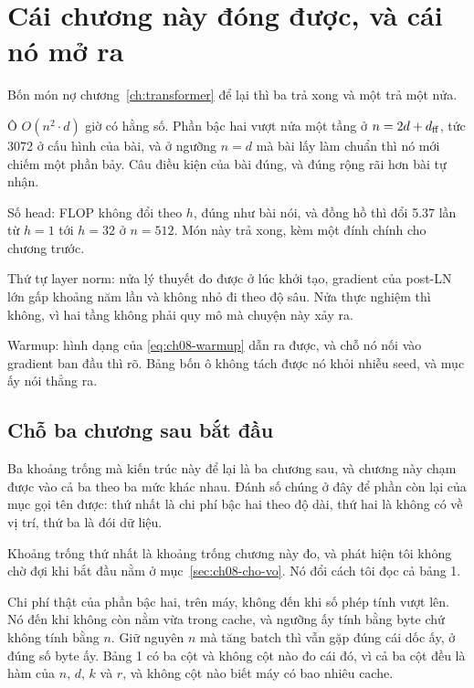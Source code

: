 \section{Cái chương này đóng được, và cái nó mở ra}
\label{sec:ch08-con-lai-gi}

%
Bốn món nợ chương~\ref{ch:transformer} để lại thì ba trả xong và một trả một
nửa.

Ô \(O(n^2 \cdot d)\) giờ có hằng số. Phần bậc hai vượt nửa một tầng ở
\(n = 2d + d_{\mathrm{ff}}\), tức 3072 ở cấu hình của bài, và ở ngưỡng \(n = d\) mà bài lấy
làm chuẩn thì nó mới chiếm một phần bảy. Câu điều kiện của bài đúng, và đúng
rộng rãi hơn bài tự nhận.

Số head: FLOP không đổi theo \(h\), đúng như bài nói, và đồng hồ thì đổi 5.37
lần từ \(h = 1\) tới \(h = 32\) ở \(n = 512\). Món này trả xong, kèm một đính chính cho chương
trước.

Thứ tự layer norm: nửa lý thuyết đo được ở lúc khởi tạo, gradient của post-LN
lớn gấp khoảng năm lần và không nhỏ đi theo độ sâu. Nửa thực nghiệm thì không,
vì hai tầng không phải quy mô mà chuyện này xảy ra.

Warmup: hình dạng của \eqref{eq:ch08-warmup} dẫn ra được, và chỗ nó nối vào
gradient ban đầu thì rõ. Bảng bốn ô không tách được nó khỏi nhiễu seed, và mục
ấy nói thẳng ra.

\subsection*{Chỗ ba chương sau bắt đầu}

Ba khoảng trống mà kiến trúc này để lại là ba chương sau, và chương này chạm
được vào cả ba theo ba mức khác nhau. Đánh số chúng ở đây để phần còn lại của
mục gọi tên được: thứ nhất là chi phí bậc hai theo độ dài, thứ hai là không có
 về vị trí, thứ ba là đói dữ liệu.

%
Khoảng trống thứ nhất là khoảng trống chương này đo, và phát hiện tôi không chờ
đợi khi bắt đầu nằm ở mục~\ref{sec:ch08-cho-vo}. Nó đổi cách tôi đọc cả bảng 1.

Chi phí thật của phần bậc hai, trên máy, không đến khi số phép tính vượt lên. Nó
đến khi  không còn nằm vừa trong cache, và
ngưỡng ấy tính bằng
byte chứ không tính bằng \(n\). Giữ nguyên \(n\) mà tăng batch thì vẫn gặp đúng
cái dốc ấy, ở đúng số byte ấy. Bảng 1 có ba cột và không cột nào đo cái đó, vì
cả ba cột đều là hàm của \(n\), \(d\), \(k\) và \(r\), và không cột nào biết máy
có bao nhiêu cache.

